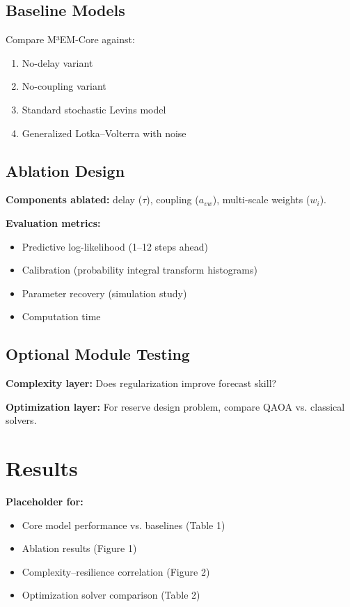 \documentclass[12pt]{article}
\begin{document}
\subsection{Baseline Models}
\label{subsec:baselines}

Compare M³EM-Core against:
\begin{enumerate}
    \item No-delay variant
    \item No-coupling variant
    \item Standard stochastic Levins model
    \item Generalized Lotka–Volterra with noise
\end{enumerate}

\subsection{Ablation Design}
\label{subsec:ablation}

\textbf{Components ablated:} delay ($\tau$), coupling ($a_{vw}$), multi-scale weights ($w_i$).

\textbf{Evaluation metrics:}
\begin{itemize}
    \item Predictive log-likelihood (1–12 steps ahead)
    \item Calibration (probability integral transform histograms)
    \item Parameter recovery (simulation study)
    \item Computation time
\end{itemize}

\subsection{Optional Module Testing}
\label{subsec:modules}

\textbf{Complexity layer:} Does regularization improve forecast skill?

\textbf{Optimization layer:} For reserve design problem, compare QAOA vs. classical solvers.

\section{Results}
\label{sec:results}

\textbf{Placeholder for:}
\begin{itemize}
    \item Core model performance vs. baselines (Table 1)
    \item Ablation results (Figure 1)
    \item Complexity–resilience correlation (Figure 2)
    \item Optimization solver comparison (Table 2)
\end{itemize}
\end{document}
